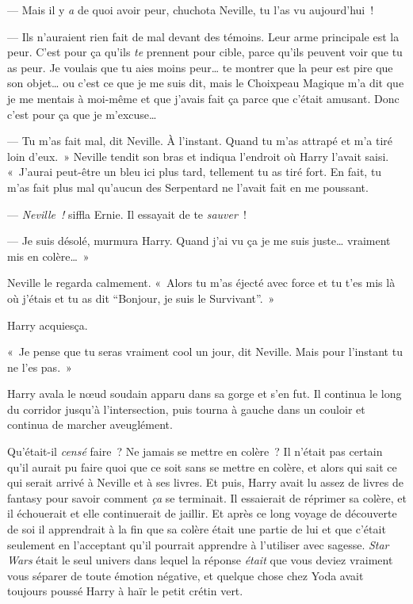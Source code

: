 --- Mais il y \emph{a} de quoi avoir peur, chuchota Neville, tu l'as vu aujourd'hui~!

--- Ils n'auraient rien fait de mal devant des témoins. Leur arme principale est la peur. C'est pour ça qu'ils \emph{te} prennent pour cible, parce qu'ils peuvent voir que tu as peur. Je voulais que tu aies moins peur… te montrer que la peur est pire que son objet… ou c'est ce que je me suis dit, mais le Choixpeau Magique m'a dit que je me mentais à moi-même et que j'avais fait ça parce que c'était amusant. Donc c'est pour ça que je m'excuse…

--- Tu m'as fait mal, dit Neville. À l'instant. Quand tu m'as attrapé et m'a tiré loin d'eux.~» Neville tendit son bras et indiqua l'endroit où Harry l'avait saisi. «~J'aurai peut-être un bleu ici plus tard, tellement tu as tiré fort. En fait, tu m'as fait plus mal qu'aucun des Serpentard ne l'avait fait en me poussant.

--- \emph{Neville~!} siffla Ernie. Il essayait de te \emph{sauver}~!

--- Je suis désolé, murmura Harry. Quand j'ai vu ça je me suis juste… vraiment mis en colère…~»

Neville le regarda calmement. «~Alors tu m'as éjecté avec force et tu t'es mis là où j'étais et tu as dit “Bonjour, je suis le Survivant”.~»

Harry acquiesça.

«~Je pense que tu seras vraiment cool un jour, dit Neville. Mais pour l'instant tu ne l'es pas.~»

Harry avala le nœud soudain apparu dans sa gorge et s'en fut. Il continua le long du corridor jusqu'à l'intersection, puis tourna à gauche dans un couloir et continua de marcher aveuglément.

Qu'était-il \emph{censé} faire~? Ne jamais se mettre en colère~? Il n'était pas certain qu'il aurait pu faire quoi que ce soit sans se mettre en colère, et alors qui sait ce qui serait arrivé à Neville et à ses livres. Et puis, Harry avait lu assez de livres de fantasy pour savoir comment \emph{ça} se terminait. Il essaierait de réprimer sa colère, et il échouerait et elle continuerait de jaillir. Et après ce long voyage de découverte de soi il apprendrait à la fin que sa colère était une partie de lui et que c'était seulement en l'acceptant qu'il pourrait apprendre à l'utiliser avec sagesse. \emph{Star Wars} était le seul univers dans lequel la réponse \emph{était} que vous deviez vraiment vous séparer de toute émotion négative, et quelque chose chez Yoda avait toujours poussé Harry à haïr le petit crétin vert.


